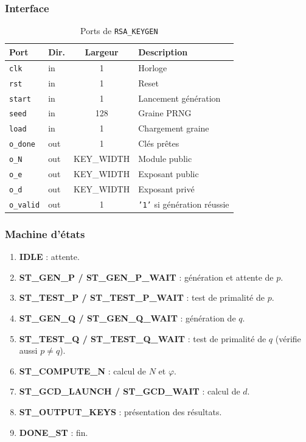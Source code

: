 \documentclass[12pt,a4paper]{report}
\begin{document}
\subsubsection{Interface}
\begin{table}[H]
\centering
\caption{Ports de \texttt{RSA\_KEYGEN}}
\begin{tabular}{llcp{5cm}}
\toprule
\textbf{Port} & \textbf{Dir.} & \textbf{Largeur} & \textbf{Description} \\
\midrule
\texttt{clk}     & in  & 1   & Horloge \\
\texttt{rst}     & in  & 1   & Reset \\
\texttt{start}   & in  & 1   & Lancement génération \\
\texttt{seed}    & in  & 128 & Graine PRNG \\
\texttt{load}    & in  & 1   & Chargement graine \\
\texttt{o\_done}  & out & 1   & Clés prêtes \\
\texttt{o\_N}     & out & KEY\_WIDTH & Module public \\
\texttt{o\_e}     & out & KEY\_WIDTH & Exposant public \\
\texttt{o\_d}     & out & KEY\_WIDTH & Exposant privé \\
\texttt{o\_valid} & out & 1   & \texttt{'1'} si génération réussie \\
\bottomrule
\end{tabular}
\end{table}

\subsubsection{Machine d'états}
\begin{enumerate}
  \item \textbf{IDLE} : attente.
  \item \textbf{ST\_GEN\_P / ST\_GEN\_P\_WAIT} : génération et attente de $p$.
  \item \textbf{ST\_TEST\_P / ST\_TEST\_P\_WAIT} : test de primalité de $p$.
  \item \textbf{ST\_GEN\_Q / ST\_GEN\_Q\_WAIT} : génération de $q$.
  \item \textbf{ST\_TEST\_Q / ST\_TEST\_Q\_WAIT} : test de primalité de $q$
        (vérifie aussi $p \neq q$).
  \item \textbf{ST\_COMPUTE\_N} : calcul de $N$ et $\varphi$.
  \item \textbf{ST\_GCD\_LAUNCH / ST\_GCD\_WAIT} : calcul de $d$.
  \item \textbf{ST\_OUTPUT\_KEYS} : présentation des résultats.
  \item \textbf{DONE\_ST} : fin.
\end{enumerate}
\end{document}
